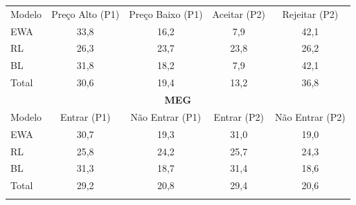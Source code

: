 \begin{tabela}[H]
\small
\centering
\caption{Distribuição percentual das estratégias nos jogos BSG e MEG segundo modelo de aprendizagem}
\begin{tabular}{l|c c c c}
\Xhline{2\arrayrulewidth}
\multicolumn{5}{c}{\textbf{BSG}} \\ \hline
Modelo & Preço Alto (P1) & Preço Baixo (P1) & Aceitar (P2) & Rejeitar (P2) \\ \hline
EWA & 33,8 & 16,2 & 7,9 & 42,1 \\
RL & 26,3 & 23,7 & 23,8 & 26,2 \\
BL & 31,8 & 18,2 & 7,9 & 42,1 \\
Total & 30,6 & 19,4 & 13,2 & 36,8 \\ 
\hline
\multicolumn{5}{c}{\textbf{MEG}} \\ \hline
Modelo & Entrar (P1) & Não Entrar (P1) & Entrar (P2) & Não Entrar (P2) \\ \hline
EWA & 30,7 & 19,3 & 31,0 & 19,0 \\
RL & 25,8 & 24,2 & 25,7 & 24,3 \\
BL & 31,3 & 18,7 & 31,4 & 18,6 \\
Total & 29,2 & 20,8 & 29,4 & 20,6 \\ 
\Xhline{2\arrayrulewidth}
\end{tabular}
\label{tabela_9}
\caption*{\fontsize{10}{12}\selectfont Fonte: Elaborado pelo autor (2024).}
\end{tabela}

